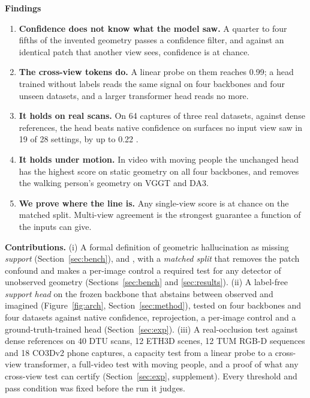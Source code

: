 \documentclass[10pt,twocolumn,letterpaper]{article}
\begin{document}
\begin{findings}
\textbf{Findings}
\begin{enumerate}[leftmargin=1.2em,itemsep=1pt,topsep=1pt,parsep=0pt]
\item \textbf{Confidence does not know what the model saw.} A quarter to four fifths of the invented geometry passes a confidence filter, and against an identical patch that another view sees, confidence is at chance.
\item \textbf{The cross-view tokens do.} A linear probe on them reaches \auroc{} 0.99; a head trained without labels reads the same signal on four backbones and four unseen datasets, and a larger transformer head reads no more.
\item \textbf{It holds on real scans.} On 64 captures of three real datasets, against dense references, the head beats native confidence on surfaces no input view saw in 19 of 28 settings, by up to 0.22 \auroc.
\item \textbf{It holds under motion.} In video with moving people the unchanged head has the highest score on static geometry on all four backbones, and removes the walking person's geometry on VGGT and DA3.
\item \textbf{We prove where the line is.} Any single-view score is at chance on the matched split. Multi-view agreement is the strongest guarantee a function of the inputs can give.
\end{enumerate}
\end{findings}

\noindent\textbf{Contributions.}
(i) A formal definition of geometric hallucination as missing \emph{support} (Section~\ref{sec:bench}), and \bench{}, with a \emph{matched split} that removes the patch confound and makes a per-image control a required test for any detector of unobserved geometry (Sections~\ref{sec:bench} and \ref{sec:results}).
(ii) A label-free \emph{support head} on the frozen backbone that abstains between observed and imagined (Figure~\ref{fig:arch}, Section~\ref{sec:method}), tested on four backbones and four datasets against native confidence, reprojection, a per-image control and a ground-truth-trained head (Section~\ref{sec:exp}).
(iii) A real-occlusion test against dense references on 40 DTU scans, 12 ETH3D scenes, 12 TUM RGB-D sequences and 18 CO3Dv2 phone captures, a capacity test from a linear probe to a cross-view transformer, a full-video test with moving people, and a proof of what any cross-view test can certify (Section~\ref{sec:exp}, supplement).
Every threshold and pass condition was fixed before the run it judges.
\end{document}
